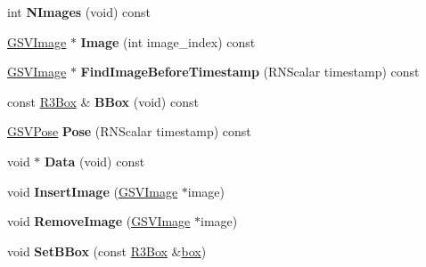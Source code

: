 \begin{DoxyCompactItemize}
\item 
int {\bfseries N\+Images} (void) const \hypertarget{class_g_s_v_tapestry_a40b76d7180f74feecdf29632762d1d1b}{}\label{class_g_s_v_tapestry_a40b76d7180f74feecdf29632762d1d1b}

\item 
\hyperlink{class_g_s_v_image}{G\+S\+V\+Image} $\ast$ {\bfseries Image} (int image\+\_\+index) const \hypertarget{class_g_s_v_tapestry_ad6211b4e05c7387ead0af1f900983202}{}\label{class_g_s_v_tapestry_ad6211b4e05c7387ead0af1f900983202}

\item 
\hyperlink{class_g_s_v_image}{G\+S\+V\+Image} $\ast$ {\bfseries Find\+Image\+Before\+Timestamp} (R\+N\+Scalar timestamp) const \hypertarget{class_g_s_v_tapestry_a3c8285c35b52da03eda2e7dbef0f62cb}{}\label{class_g_s_v_tapestry_a3c8285c35b52da03eda2e7dbef0f62cb}

\item 
const \hyperlink{class_r3_box}{R3\+Box} \& {\bfseries B\+Box} (void) const \hypertarget{class_g_s_v_tapestry_a85fa49fc39b18a596d8e66c0cd2591ea}{}\label{class_g_s_v_tapestry_a85fa49fc39b18a596d8e66c0cd2591ea}

\item 
\hyperlink{class_g_s_v_pose}{G\+S\+V\+Pose} {\bfseries Pose} (R\+N\+Scalar timestamp) const \hypertarget{class_g_s_v_tapestry_a78c7bd6b2c551d284d89035bcaaa7f76}{}\label{class_g_s_v_tapestry_a78c7bd6b2c551d284d89035bcaaa7f76}

\item 
void $\ast$ {\bfseries Data} (void) const \hypertarget{class_g_s_v_tapestry_a82d33f6d3927b311c96ddf5a36f459f9}{}\label{class_g_s_v_tapestry_a82d33f6d3927b311c96ddf5a36f459f9}

\item 
void {\bfseries Insert\+Image} (\hyperlink{class_g_s_v_image}{G\+S\+V\+Image} $\ast$image)\hypertarget{class_g_s_v_tapestry_aeb3a32c4e5cfb9cb126c552138960bf0}{}\label{class_g_s_v_tapestry_aeb3a32c4e5cfb9cb126c552138960bf0}

\item 
void {\bfseries Remove\+Image} (\hyperlink{class_g_s_v_image}{G\+S\+V\+Image} $\ast$image)\hypertarget{class_g_s_v_tapestry_a33dfe4641d7297bedc1c4192c2b1821c}{}\label{class_g_s_v_tapestry_a33dfe4641d7297bedc1c4192c2b1821c}

\item 
void {\bfseries Set\+B\+Box} (const \hyperlink{class_r3_box}{R3\+Box} \&\hyperlink{structbox}{box})\hypertarget{class_g_s_v_tapestry_aa285354eb17a101bfcdbbd478da88c9a}{}\label{class_g_s_v_tapestry_aa285354eb17a101bfcdbbd478da88c9a}


\end{DoxyCompactItemize}
